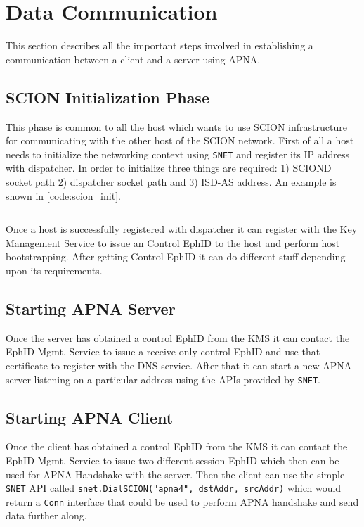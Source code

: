 \section{Data Communication} \label{overlay:comm}
This section describes all the important steps involved in establishing a communication between a client and a server using APNA.
\subsection{SCION Initialization Phase}
This phase is common to all the host which wants to use SCION infrastructure for communicating with the other host of the SCION network. First of all a host needs to initialize the networking context using \texttt{SNET} and register its IP address with dispatcher. In order to initialize three things are required: 1) SCIOND socket path 2) dispatcher socket path and 3) ISD-AS address. An example is shown in \ref{code:scion_init}.

\begin{code}
\inputminted[frame=lines, framesep=2mm, baselinestretch=1.2, fontsize=\footnotesize, linenos]{go}{code_snippets/scion_init.go} \label{code:scion_init}
\end{code}

Once a host is successfully registered with dispatcher it can register with the Key Management Service to issue an Control EphID to the host and perform host bootstrapping. After getting Control EphID it can do different stuff depending upon its requirements.

\subsection{Starting APNA Server}
Once the server has obtained a control EphID from the KMS it can contact the EphID Mgmt. Service to issue a receive only control EphID and use that certificate to register with the DNS service. After that it can start a new APNA server listening on a particular address using the APIs provided by \texttt{SNET}.

\subsection{Starting APNA Client}
Once the client has obtained a control EphID from the KMS it can contact the EphID Mgmt. Service to issue two different session EphID which then can be used for APNA Handshake with the server. Then the client can use the simple \texttt{SNET} API called \texttt{snet.DialSCION("apna4", dstAddr, srcAddr)} which would return a \texttt{Conn} interface that could be used to perform APNA handshake and send data further along.

